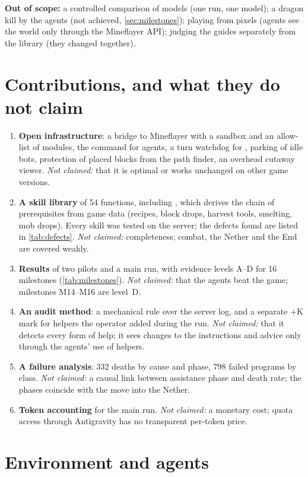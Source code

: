\documentclass[11pt]{article}
\begin{document}
\textbf{Out of scope:} a controlled comparison of models (one run, one model); a dragon kill by the agents (not achieved, \cref{sec:milestones}); playing from pixels (agents see the world only through the Mineflayer API); judging the guides separately from the library (they changed together).

\section{Contributions, and what they do not claim}
\begin{enumerate}\renewcommand{\labelenumi}{(\alph{enumi})}
\item \textbf{Open infrastructure}: a bridge to Mineflayer with a  sandbox and an allow-list of modules, the  command for agents, a turn watchdog for , parking of idle bots, protection of placed blocks from the path finder, an overhead cutaway viewer. \emph{Not claimed:} that it is optimal or works unchanged on other game versions.
\item \textbf{A skill library} of 54 functions, including , which derives the chain of prerequisites from game data (recipes, block drops, harvest tools, smelting, mob drops). Every skill was tested on the server; the defects found are listed in \cref{tab:defects}. \emph{Not claimed:} completeness; combat, the Nether and the End are covered weakly.
\item \textbf{Results} of two pilots and a main run, with evidence levels A--D for 16 milestones (\cref{tab:milestones}). \emph{Not claimed:} that the agents beat the game; milestones M14--M16 are level~D.
\item \textbf{An audit method}: a mechanical rule over the server log, and a separate +K mark for helpers the operator added during the run. \emph{Not claimed:} that it detects every form of help; it sees changes to the instructions and advice only through the agents' use of helpers.
\item \textbf{A failure analysis}: 332 deaths by cause and phase, 798 failed programs by class. \emph{Not claimed:} a causal link between assistance phase and death rate; the phases coincide with the move into the Nether.
\item \textbf{Token accounting} for the main run. \emph{Not claimed:} a monetary cost; quota access through Antigravity has no transparent per-token price.
\end{enumerate}

\section{Environment and agents}
\end{document}
